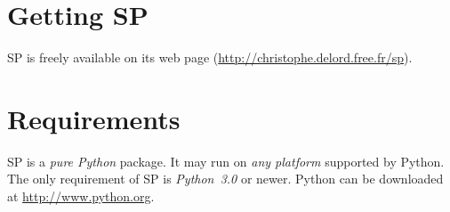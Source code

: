 
\section{Getting SP}

SP is freely available on its web page (\url{http://christophe.delord.free.fr/sp}).

\section{Requirements}

SP is a \emph{pure Python} package.
It may run on \emph{any platform} supported by Python.
The only requirement of SP is \emph{Python~3.0} or newer. Python can be downloaded at \url{http://www.python.org}.
